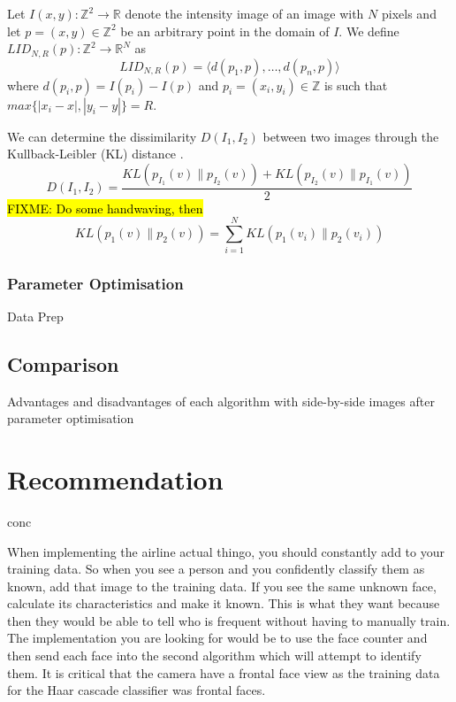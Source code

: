 \documentclass{article}
\begin{document}
Let $I(x,y) : \mathbb{Z}^2 \rightarrow \mathbb{R}$ denote the intensity image of an image with $N$ pixels and let $p = (x,y) \in \mathbb{Z}^2$ be an arbitrary point in the domain of $I$. We define $LID_{N,R}(p) : \mathbb{Z}^2 \rightarrow \mathbb{R}^N$ as
\begin{equation}
   LID_{N,R}(p) = \langle d(p_1,p), \ldots, d(p_n,p)\rangle
\end{equation}
where $d(p_i,p) = I(p_i) - I(p)$ and $p_i = (x_i, y_i) \in \mathbb{Z}$ is such that $max\{|x_i - x|, |y_i - y|\} = R$. %

We can determine the dissimilarity $D(I_1, I_2)$ between two images through the Kullback-Leibler (KL) distance \cite{kullback1951information}.
\begin{equation}
	D(I_1, I_2) = \frac{KL\left(p_{I_1}(v) \| p_{I_2}(v)\right) +
	              KL\left(p_{I_2}(v) \| p_{I_1}(v)\right)}{2}
\end{equation}
\hl{FIXME: Do some handwaving, then}
\begin{equation}
	KL(p_1(v) \| p_2(v)) = \sum_{i=1}^{N}KL(p_1(v_i) \| p_2(v_i))
\end{equation}

\subsubsection{Parameter Optimisation}
Data Prep

\subsection{Comparison}
Advantages and disadvantages of each algorithm with side-by-side images after parameter optimisation


\section{Recommendation}
conc

When implementing the airline actual thingo, you should constantly add to your training data.
So when you see a person and you confidently classify them as known, add that image to the training data.
If you see the same unknown face, calculate its characteristics and make it known. This is what they want because then they would be able to tell who is frequent without having to manually train.
The implementation you are looking for would be to use the face counter and then send each face into the second algorithm which will attempt to identify them.
It is critical that the camera have a frontal face view as the training data for the Haar cascade classifier was frontal faces.
\end{document}
